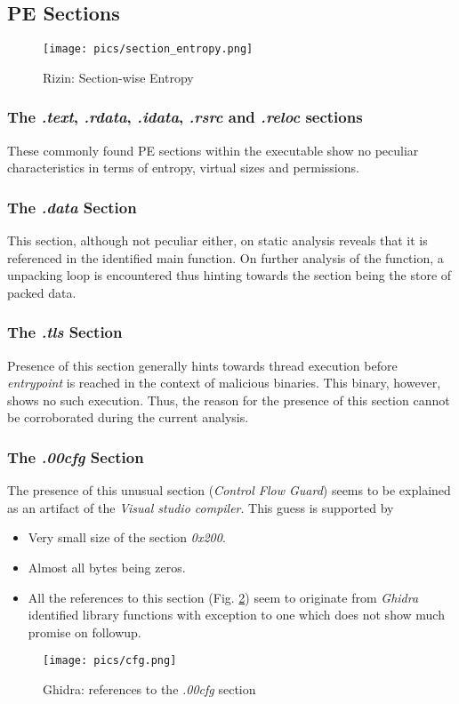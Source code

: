 \documentclass[10pt,a4paper]{article}
\begin{document}
\subsection{PE Sections}
\begin{figure}[!htbp]%
	\centering
	\texttt{[image: pics/section\_entropy.png]}
	\caption{Rizin: Section-wise Entropy}
	\label{entropy}
\end{figure}

	\subsubsection{The \textit{.text}, \textit{.rdata}, \textit{.idata}, \textit{.rsrc} and \textit{.reloc} sections}
	These commonly found PE sections within the executable show no peculiar characteristics in terms of entropy, virtual sizes and permissions.
	\subsubsection{The \textit{.data} Section}
	This section, although not peculiar either, on static analysis reveals that it is referenced in the identified main function.
	On further analysis of the function, a unpacking loop is encountered thus hinting towards the section being the store of packed data.
	\subsubsection{The \textit{.tls} Section}
	Presence of this section generally hints towards thread execution before \textit{entrypoint} is reached in the context of malicious binaries.
	This binary, however, shows no such execution. Thus, the reason for the presence of this section cannot be corroborated during the current analysis.
	\subsubsection{The \textit{.00cfg} Section}
	The presence of this unusual section (\textit{Control Flow Guard}) seems to be explained as an artifact of the \textit{Visual studio compiler}.
	This guess is supported by
	\begin{itemize}
		\item Very small size of the section \textit{0x200}.
		\item Almost all bytes being zeros.
		\item All the references to this section (Fig. \ref{cfg}) seem to originate from \textit{Ghidra} identified library functions with exception to one which does not show much promise on followup.
	\end{itemize}
	\begin{figure}[!htbp]%
		\centering
		\texttt{[image: pics/cfg.png]}
		\caption{Ghidra: references to the \textit{.00cfg} section}
		\label{cfg}
	\end{figure}
\end{document}
